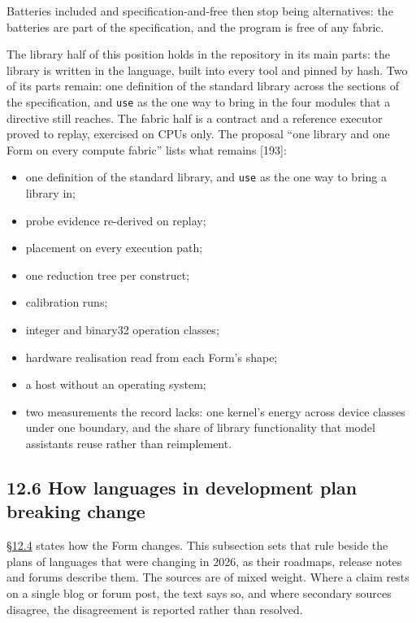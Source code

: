 \documentclass[10pt,letterpaper]{article}
\providecommand{\tightlist}{\setlength{\itemsep}{1pt}\setlength{\parskip}{0pt}}
\begin{document}
Batteries included and specification-and-free then stop being
alternatives: the batteries are part of the specification, and the
program is free of any fabric.

The library half of this position holds in the repository in its main
parts: the library is written in the language, built into every tool and
pinned by hash. Two of its parts remain: one definition of the standard
library across the sections of the specification, and \texttt{use} as
the one way to bring in the four modules that a directive still reaches.
The fabric half is a contract and a reference executor proved to replay,
exercised on CPUs only. The proposal ``one library and one Form on every
compute fabric'' lists what remains {[}193{]}:

\begin{itemize}
\tightlist
\item
  one definition of the standard library, and \texttt{use} as the one
  way to bring a library in;
\item
  probe evidence re-derived on replay;
\item
  placement on every execution path;
\item
  one reduction tree per construct;
\item
  calibration runs;
\item
  integer and binary32 operation classes;
\item
  hardware realisation read from each Form's shape;
\item
  a host without an operating system;
\item
  two measurements the record lacks: one kernel's energy across device
  classes under one boundary, and the share of library functionality
  that model assistants reuse rather than reimplement.
\end{itemize}

\subsection{12.6 How languages in development plan breaking
change}\label{how-languages-in-development-plan-breaking-change}

\href{https://research.openie.dev/papers/rce/\#124-how-the-language-grows-and-shrinks}{§12.4}
states how the Form changes. This subsection sets that rule beside the
plans of languages that were changing in 2026, as their roadmaps,
release notes and forums describe them. The sources are of mixed weight.
Where a claim rests on a single blog or forum post, the text says so,
and where secondary sources disagree, the disagreement is reported
rather than resolved.
\end{document}
